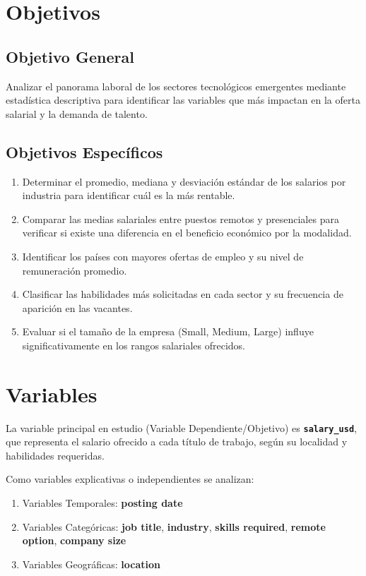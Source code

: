 \documentclass[oneside,11pt]{Latex/Classes/PhDthesisPSnPDF}
\begin{document}
\section{Objetivos}

\subsection{Objetivo General}

Analizar el panorama laboral de los sectores tecnológicos emergentes
mediante estadística descriptiva para identificar las variables que más
impactan en la oferta salarial y la demanda de talento.

\subsection{Objetivos Específicos}

\begin{enumerate}
  \item Determinar el promedio, mediana y desviación estándar de los salarios por industria para identificar cuál es la más rentable.
  \item Comparar las medias salariales entre puestos remotos y presenciales para verificar si existe una diferencia en el beneficio económico por la modalidad.
  \item Identificar los países con mayores ofertas de empleo y su nivel de remuneración promedio.
  \item Clasificar las habilidades más solicitadas en cada sector y su frecuencia de aparición en las vacantes.
  \item Evaluar si el tamaño de la empresa (Small, Medium, Large) influye significativamente en los rangos salariales ofrecidos.
\end{enumerate}

\section{Variables}

La variable principal en estudio (Variable Dependiente/Objetivo) es
\textbf{\texttt{salary\_usd}}, que representa el salario ofrecido a cada
título de trabajo, según su localidad y habilidades requeridas.

Como variables explicativas o independientes se analizan:

\begin{enumerate}
  \item Variables Temporales: \textbf{posting date}
  \item Variables Categóricas: \textbf{job title}, \textbf{industry}, \textbf{skills required}, \textbf{remote option}, \textbf{company size}
  \item Variables Geográficas: \textbf{location}
\end{enumerate}
\end{document}
